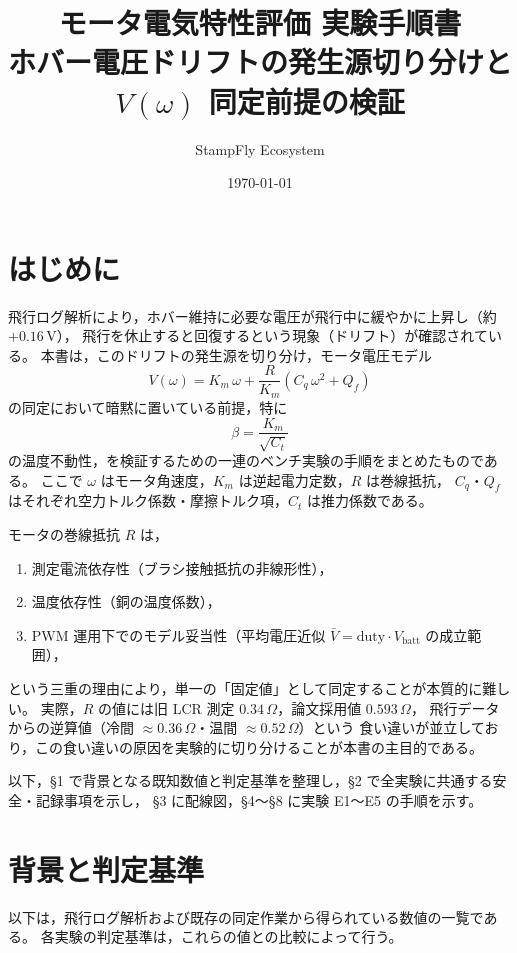 \documentclass[a4paper,11pt]{ltjsarticle}
\title{\textbf{モータ電気特性評価 実験手順書}\\[2mm]
\large ホバー電圧ドリフトの発生源切り分けと $V(\omega)$ 同定前提の検証}
\author{StampFly Ecosystem}
\date{\today}
\begin{document}
\maketitle
\thispagestyle{plain}

\section*{はじめに}
飛行ログ解析により，ホバー維持に必要な電圧が飛行中に緩やかに上昇し（約 $+0.16\,\mathrm{V}$），
飛行を休止すると回復するという現象（ドリフト）が確認されている。
本書は，このドリフトの発生源を切り分け，モータ電圧モデル
\[
V(\omega) = K_m\,\omega + \frac{R}{K_m}\left(C_q\,\omega^2 + Q_f\right)
\]
の同定において暗黙に置いている前提，特に
\[
\beta = \frac{K_m}{\sqrt{C_t}}
\]
の温度不動性，を検証するための一連のベンチ実験の手順をまとめたものである。
ここで $\omega$ はモータ角速度，$K_m$ は逆起電力定数，$R$ は巻線抵抗，
$C_q$・$Q_f$ はそれぞれ空力トルク係数・摩擦トルク項，$C_t$ は推力係数である。

モータの巻線抵抗 $R$ は，
\begin{enumerate}
  \item[(a)] 測定電流依存性（ブラシ接触抵抗の非線形性），
  \item[(b)] 温度依存性（銅の温度係数），
  \item[(c)] PWM 運用下でのモデル妥当性（平均電圧近似 $\bar V = \mathrm{duty}\cdot V_\mathrm{batt}$ の成立範囲），
\end{enumerate}
という三重の理由により，単一の「固定値」として同定することが本質的に難しい。
実際，$R$ の値には旧 LCR 測定 $0.34\,\Omega$，論文採用値 $0.593\,\Omega$，
飛行データからの逆算値（冷間 $\approx 0.36\,\Omega$・温間 $\approx 0.52\,\Omega$）という
食い違いが並立しており，この食い違いの原因を実験的に切り分けることが本書の主目的である。

以下，\S1 で背景となる既知数値と判定基準を整理し，\S2 で全実験に共通する安全・記録事項を示し，
\S3 に配線図，\S4〜\S8 に実験 E1〜E5 の手順を示す。

\section{背景と判定基準}
以下は，飛行ログ解析および既存の同定作業から得られている数値の一覧である。
各実験の判定基準は，これらの値との比較によって行う。
\end{document}
